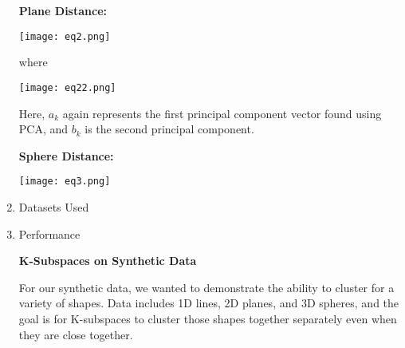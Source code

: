 \documentclass[12pt]{article}
\begin{document}
\begin{enumerate}
\textbf{Plane Distance:}

\texttt{[image: eq2.png]}

where 

\texttt{[image: eq22.png]}

Here, $a_k$ again represents the first principal component vector found using PCA, and $b_k$ is the second principal component.

\smallskip

\textbf{Sphere Distance:}

\texttt{[image: eq3.png]}




\item Datasets Used

\item Performance

\textbf{K-Subspaces on Synthetic Data}

 For our synthetic data, we wanted to demonstrate the ability to cluster for a variety of shapes. Data includes 1D lines, 2D planes, and 3D spheres, and the goal is for K-subspaces to cluster those shapes together separately even when they are close together. 



\end{enumerate}
\end{document}
